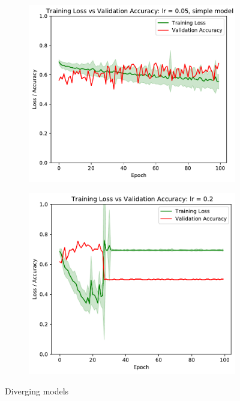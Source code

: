 \documentclass[sigconf,nonacm]{acmart}
\begin{document}
\begin{figure}[ht]
\begin{subfigure}[c]{0.45\columnwidth}
\includegraphics[width=\textwidth]{plot_simple_0.05.pdf}
\end{subfigure}
\begin{subfigure}[c]{0.45\columnwidth}
\includegraphics[width=\textwidth]{plot_0.2.pdf}
\end{subfigure}
\caption{Diverging models}
\label{part2:diverging}
\end{figure}
\end{document}
